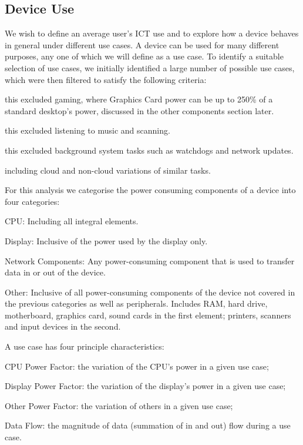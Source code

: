 \documentclass[conference]{IEEEtran}
\begin{document}
\subsection{Device Use}

We wish to define an average user's ICT use and to explore how a
device behaves in general under different use cases.  A device can be
used for many different purposes, any one of which we will define as a
use case.  To identify a suitable selection of use cases, we initially
identified a large number of possible use cases, which were then
filtered to satisfy the following criteria:

 this excluded gaming, where Graphics Card power
can be up to 250\% of a standard desktop’s power, discussed in the
other components section later.

 this
excluded listening to music and scanning.

 this excluded background system tasks such as
watchdogs and network updates.

 including cloud
and non-cloud variations of similar tasks.

For this analysis we categorise the power consuming components of
a device into four categories:

\begin{compactitem}
\item CPU: Including all integral elements.
\item Display: Inclusive of the power used by the display only.
\item Network Components: Any power-consuming component that is used
  to transfer data in or out of the device.
\item Other: Inclusive of all power-consuming components
  of the device not covered in the previous categories as well as
  peripherals. Includes RAM, hard drive, motherboard, graphics
  card, sound cards in the first element; printers, scanners and input
  devices in the second.
\end{compactitem}

A use case has four principle characteristics:

\begin{compactitem}
\item CPU Power Factor: the variation of the CPU’s power in a given use case;
\item Display Power Factor: the variation of the display's power in a given use case;
\item Other Power Factor: the variation of others in a given use case;
\item Data Flow: the magnitude of data (summation of in and out) flow during a use case.
\end{compactitem}
\end{document}
